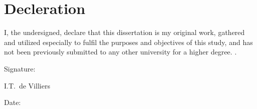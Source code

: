 \chapter{Decleration}
I, the undersigned, declare that
this dissertation is my original work, gathered and utilized especially to fulfil the
purposes and objectives of this study, and has not been previously submitted to any
other university for a higher degree.
.\par
\vspace{3cm}

\noindent%
\parbox{.5\textwidth}{%
  Signature:\quad\dotfill\par
  \hfill I.T.\ de Villiers\hspace{1.2cm}\null}


\vspace{1.5cm}
\noindent%
\parbox{.5\textwidth}{%
  Date:\quad\dotfill\par}
